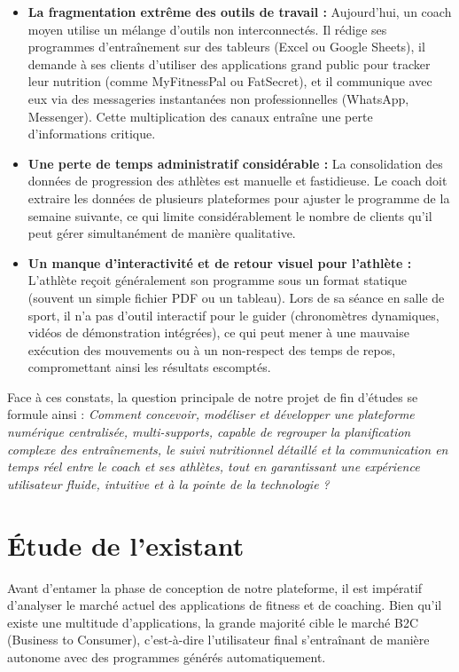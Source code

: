 \begin{itemize}
    \item \textbf{La fragmentation extrême des outils de travail :} Aujourd'hui, un coach moyen utilise un mélange d'outils non interconnectés. Il rédige ses programmes d'entraînement sur des tableurs (Excel ou Google Sheets), il demande à ses clients d'utiliser des applications grand public pour tracker leur nutrition (comme MyFitnessPal ou FatSecret), et il communique avec eux via des messageries instantanées non professionnelles (WhatsApp, Messenger). Cette multiplication des canaux entraîne une perte d'informations critique.
    \item \textbf{Une perte de temps administratif considérable :} La consolidation des données de progression des athlètes est manuelle et fastidieuse. Le coach doit extraire les données de plusieurs plateformes pour ajuster le programme de la semaine suivante, ce qui limite considérablement le nombre de clients qu'il peut gérer simultanément de manière qualitative.
    \item \textbf{Un manque d'interactivité et de retour visuel pour l'athlète :} L'athlète reçoit généralement son programme sous un format statique (souvent un simple fichier PDF ou un tableau). Lors de sa séance en salle de sport, il n'a pas d'outil interactif pour le guider (chronomètres dynamiques, vidéos de démonstration intégrées), ce qui peut mener à une mauvaise exécution des mouvements ou à un non-respect des temps de repos, compromettant ainsi les résultats escomptés.
\end{itemize}

Face à ces constats, la question principale de notre projet de fin d'études se formule ainsi : 
\textit{Comment concevoir, modéliser et développer une plateforme numérique centralisée, multi-supports, capable de regrouper la planification complexe des entraînements, le suivi nutritionnel détaillé et la communication en temps réel entre le coach et ses athlètes, tout en garantissant une expérience utilisateur fluide, intuitive et à la pointe de la technologie ?}

\section{Étude de l’existant}
Avant d'entamer la phase de conception de notre plateforme, il est impératif d'analyser le marché actuel des applications de fitness et de coaching. Bien qu'il existe une multitude d'applications, la grande majorité cible le marché B2C (Business to Consumer), c'est-à-dire l'utilisateur final s'entraînant de manière autonome avec des programmes générés automatiquement.

